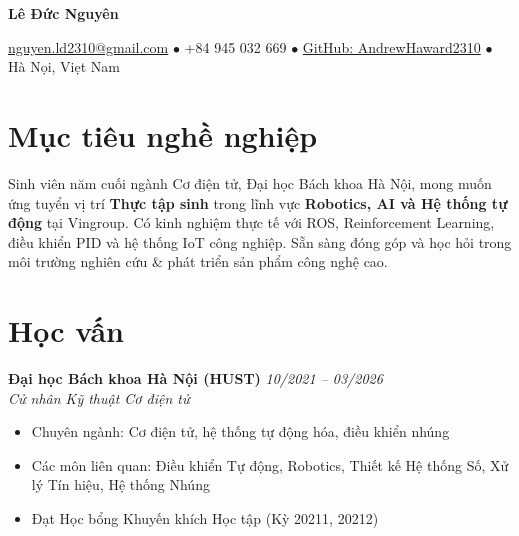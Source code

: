\documentclass[11pt,a4paper]{article}
\newcommand{\cvname}[1]{
  \centerline{\LARGE\textbf{#1}}
  \vspace{0.3em}
}
\newcommand{\cvcontact}[1]{
  \centerline{\small #1}
}
\newcommand{\cventry}[4]{
  \noindent\textbf{#1} \hfill \textit{#2} \\
  \textit{#3} \\
  #4
  \vspace{0.4em}
}
\begin{document}
\cvname{Lê Đức Nguyên}

\cvcontact{
  \href{mailto:nguyen.ld2310@gmail.com}{nguyen.ld2310@gmail.com}
  \quad $\bullet$ \quad +84 945 032 669
  \quad $\bullet$ \quad \href{https://github.com/AndrewHaward2310}{GitHub: AndrewHaward2310}
  \quad $\bullet$ \quad H\`a N\d{o}i, Vi\d{e}t Nam
}

\vspace{0.5em}

\section{Mục tiêu nghề nghiệp}

Sinh viên năm cuối ngành Cơ điện tử, Đại học Bách khoa Hà Nội, mong muốn ứng tuyển vị trí \textbf{Thực tập sinh} trong lĩnh vực \textbf{Robotics, AI và Hệ thống tự động} tại Vingroup. Có kinh nghiệm thực tế với ROS, Reinforcement Learning, điều khiển PID và hệ thống IoT công nghiệp. Sẵn sàng đóng góp và học hỏi trong môi trường nghiên cứu \& phát triển sản phẩm công nghệ cao.

\section{Học vấn}

\cventry
  {Đại học Bách khoa Hà Nội (HUST)}
  {10/2021 -- 03/2026}
  {Cử nhân Kỹ thuật Cơ điện tử}
  {
    \begin{itemize}[leftmargin=1.5em, topsep=0pt, itemsep=0.15em]
      \item Chuyên ngành: Cơ điện tử, hệ thống tự động hóa, điều khiển nhúng
      \item Các môn liên quan: Điều khiển Tự động, Robotics, Thiết kế Hệ thống Số, Xử lý Tín hiệu, Hệ thống Nhúng
      \item Đạt Học bổng Khuyến khích Học tập (Kỳ 20211, 20212)
    \end{itemize}
  }

\end{document}
